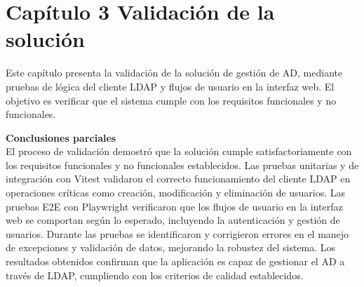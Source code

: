 \section{Capítulo 3 Validación de la solución}

Este capítulo presenta la validación de la solución de gestión de AD, mediante pruebas de lógica del cliente LDAP y flujos de usuario en la interfaz web. El objetivo es verificar que el sistema cumple con los requisitos funcionales y no funcionales.




\textbf{Conclusiones parciales}\\
El proceso de validación demostró que la solución cumple satisfactoriamente con los requisitos funcionales y no funcionales establecidos. Las pruebas unitarias y de integración con Vitest validaron el correcto funcionamiento del cliente LDAP en operaciones críticas como creación, modificación y eliminación de usuarios. Las pruebas E2E con Playwright verificaron que los flujos de usuario en la interfaz web se comportan según lo esperado, incluyendo la autenticación y gestión de usuarios. Durante las pruebas se identificaron y corrigieron errores en el manejo de excepciones y validación de datos, mejorando la robustez del sistema. Los resultados obtenidos confirman que la aplicación es capaz de gestionar el AD a través de LDAP, cumpliendo con los criterios de calidad establecidos.
